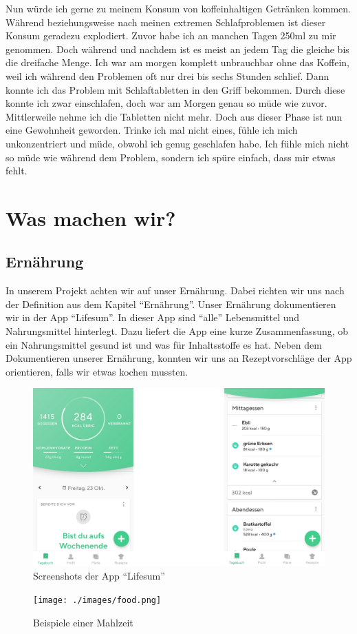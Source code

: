 \newline
Nun würde ich gerne zu meinem Konsum von koffeinhaltigen Getränken kommen. Während beziehungsweise nach meinen extremen Schlafproblemen ist dieser Konsum geradezu explodiert. Zuvor habe ich an manchen Tagen 250ml zu mir genommen. Doch während und nachdem ist es meist an jedem Tag die gleiche bis die dreifache Menge. Ich war am morgen komplett unbrauchbar ohne das Koffein, weil ich während den Problemen oft nur drei bis sechs Stunden schlief. Dann konnte ich das Problem mit Schlaftabletten in den Griff bekommen. Durch diese konnte ich zwar einschlafen, doch war am Morgen genau so müde wie zuvor. Mittlerweile nehme ich die Tabletten nicht mehr. Doch aus dieser Phase ist nun eine Gewohnheit geworden. Trinke ich mal nicht eines, fühle ich mich unkonzentriert und müde, obwohl ich genug geschlafen habe. Ich fühle mich nicht so müde wie während dem Problem, sondern ich spüre einfach, dass mir etwas fehlt.
\pagebreak
\section{Was machen wir?}
\subsection{Ernährung}
\authortoc{\dario}{\subsectionident}
In unserem Projekt achten wir auf unser Ernährung. Dabei richten wir uns nach der Definition aus dem Kapitel “Ernährung”.
\newline
Unser Ernährung dokumentieren wir in der App “Lifesum”. In dieser App sind “alle” Lebensmittel und Nahrungsmittel hinterlegt. Dazu liefert die App eine kurze Zusammenfassung, ob ein Nahrungsmittel gesund ist und was für Inhaltsstoffe es hat. Neben dem Dokumentieren unserer Ernährung, konnten wir uns an Rezeptvorschläge der App orientieren, falls wir etwas kochen mussten.
\newline
\begin{figure}[!ht]
  \centering
  \includegraphics[width=0.7\linewidth]{./images/app.png}
  \caption{Screenshots der App “Lifesum”}
  \label{fig:app_1}
\end{figure}
\newline
\begin{figure}[!ht]
  \centering
  \texttt{[image: ./images/food.png]}
  \caption{Beispiele einer Mahlzeit}
  \label{fig:app_1}
\end{figure}
\newline
